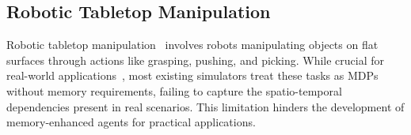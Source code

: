 \subsection{Robotic Tabletop Manipulation}
\label{app:tabletop}

Robotic tabletop manipulation~\citep{shridhar2022cliport} involves robots manipulating objects on flat surfaces through actions like grasping, pushing, and picking. While crucial for real-world applications~\citep{levine2018learning}, most existing simulators treat these tasks as MDPs without memory requirements, failing to capture the spatio-temporal dependencies present in real scenarios. This limitation hinders the development of memory-enhanced agents for practical applications.